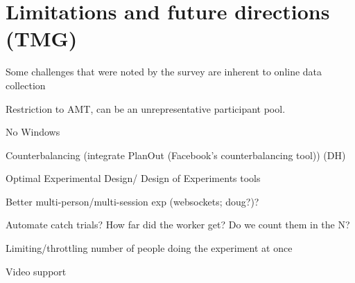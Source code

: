 \documentclass[twocolumn]{svjour3}          %
\begin{document}
\section{Limitations and future directions (TMG)}

Some challenges that were noted by the survey are inherent to online data collection 

Restriction to AMT, can be an unrepresentative participant pool. 

No Windows

Counterbalancing (integrate PlanOut (Facebook's counterbalancing tool)) (DH)

Optimal Experimental Design/ Design of Experiments tools

Better multi-person/multi-session exp (websockets; doug?)?

Automate catch trials? How far did the worker get? Do we count them in the N? 

Limiting/throttling number of people doing the experiment at once

Video support

%
\end{document}
